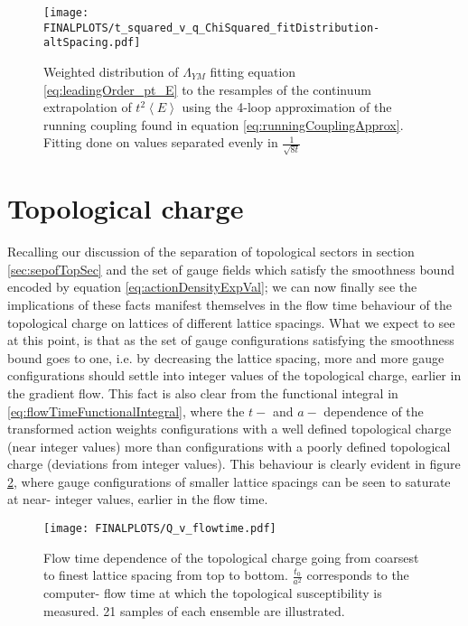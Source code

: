 \documentclass[a4paper,10pt]{book}
\begin{document}
\begin{figure}[htbp]
\centering
\texttt{[image: FINALPLOTS/t\_squared\_v\_q\_ChiSquared\_fitDistribution-altSpacing.pdf]}
\caption[]{Weighted distribution of $\Lambda_{YM}$ fitting equation \eqref{eq:leadingOrder_pt_E} to the resamples of the continuum extrapolation of $t^2\left\langle E\right\rangle $ using the 4-loop approximation of the running coupling found in equation \eqref{eq:runningCouplingApprox}. Fitting done on values separated evenly in $\frac{1}{\sqrt{8t}}$}\label{fig:YM-Scale_chiSquaredFit-altspac}
\end{figure}
\FloatBarrier
\section{Topological charge}
Recalling our discussion of the separation of topological sectors in section \ref{sec:sepofTopSec} and the set of gauge fields which satisfy the smoothness bound encoded by equation \eqref{eq:actionDensityExpVal}; we can now finally see the implications of these facts manifest themselves in the flow time behaviour of the topological charge on lattices of different lattice spacings. What we expect to see at this point, is that as the set of gauge configurations satisfying the smoothness bound goes to one, i.e. by decreasing the lattice spacing, more and more gauge configurations should settle into integer values of the topological charge, earlier in the gradient flow. This fact is also clear from the functional integral in \eqref{eq:flowTimeFunctionalIntegral}, where the $t-$ and $a-$ dependence of the transformed action weights configurations with a well defined topological charge (near integer values) more than configurations with a poorly defined topological charge (deviations from integer values). This behaviour is clearly evident in figure \ref{fig:QvFlowTime}, where gauge configurations of smaller lattice spacings can be seen to saturate at near- integer values, earlier in the flow time.
\begin{figure}[htbp]
\centering
\texttt{[image: FINALPLOTS/Q\_v\_flowtime.pdf]}
\caption[]{Flow time dependence of the topological charge going from coarsest to finest lattice spacing from top to bottom. $\frac{t_0}{a^2}$ corresponds to the computer- flow time at which the topological susceptibility is measured. 21 samples of each ensemble are illustrated.}\label{fig:QvFlowTime}
\end{figure}
\end{document}
